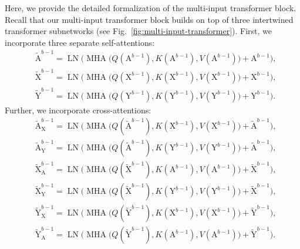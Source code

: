 \documentclass{article}
\theoremstyle{plain}
\theoremstyle{definition}
\theoremstyle{remark}
\begin{document}
Here, we provide the detailed formalization of the multi-input transformer block. Recall that our multi-input transformer block builds on top of three intertwined transformer subnetworks (see Fig.~\ref{fig:multi-input-transformer}). First, we incorporate three separate self-attentions:
\begin{align}
        & \tilde{\mathrm{A}}^{b - 1} = \operatorname{LN}\Big(\operatorname{MHA}\big(Q(\mathrm{A}^{b - 1}), K(\mathrm{A}^{b - 1}), V(\mathrm{A}^{b - 1})\big) + \mathrm{A}^{b - 1}\Big) , \\
        & \tilde{\mathrm{X}}^{b - 1} = \operatorname{LN}\Big(\operatorname{MHA}\big(Q(\mathrm{X}^{b - 1}), K(\mathrm{X}^{b - 1}), V(\mathrm{X}^{b - 1})\big) + \mathrm{X}^{b - 1}\Big) , \\
        & \tilde{\mathrm{Y}}^{b - 1} = \operatorname{LN}\Big(\operatorname{MHA}\big(Q(\mathrm{Y}^{b - 1}), K(\mathrm{Y}^{b - 1}), V(\mathrm{Y}^{b - 1})\big) + \mathrm{Y}^{b - 1}\Big) .
\end{align}
Further, we incorporate cross-attentions:
\begin{align}
        & \tilde{\mathrm{A}}^{b - 1}_{\mathrm{X}} = 
        \operatorname{LN}\Big(\operatorname{MHA}\big(Q(\tilde{\mathrm{A}}^{b - 1}), K(\mathrm{X}^{b - 1}), V(\mathrm{X}^{b - 1})\big) + \tilde{\mathrm{A}}^{b - 1}\Big) , \\ 
        & \tilde{\mathrm{A}}^{b - 1}_{\mathrm{Y}} = 
        \operatorname{LN}\Big(\operatorname{MHA}\big(Q(\tilde{\mathrm{A}}^{b - 1}), K(\mathrm{Y}^{b - 1}), V(\mathrm{Y}^{b - 1})\big) + \tilde{\mathrm{A}}^{b - 1}\Big) , \\[0.3cm]
        & \tilde{\mathrm{X}}^{b - 1}_{\mathrm{A}} = 
        \operatorname{LN}\Big(\operatorname{MHA}\big(Q(\tilde{\mathrm{X}}^{b - 1}), K(\mathrm{A}^{b - 1}), V(\mathrm{A}^{b - 1})\big) + \tilde{\mathrm{X}}^{b - 1}\Big) , \\ 
        & \tilde{\mathrm{X}}^{b - 1}_{\mathrm{Y}} = 
        \operatorname{LN}\Big(\operatorname{MHA}\big(Q(\tilde{\mathrm{X}}^{b - 1}), K(\mathrm{Y}^{b - 1}), V(\mathrm{Y}^{b - 1})\big) + \tilde{\mathrm{X}}^{b - 1}\Big) , \\[0.3cm]
        & \tilde{\mathrm{Y}}^{b - 1}_{\mathrm{X}} = 
        \operatorname{LN}\Big(\operatorname{MHA}\big(Q(\tilde{\mathrm{Y}}^{b - 1}), K(\mathrm{X}^{b - 1}), V(\mathrm{X}^{b - 1})\big) + \tilde{\mathrm{Y}}^{b - 1}\Big) , \\ 
        & \tilde{\mathrm{Y}}^{b - 1}_{\mathrm{A}} = 
        \operatorname{LN}\Big(\operatorname{MHA}\big(Q(\tilde{\mathrm{Y}}^{b - 1}), K(\mathrm{A}^{b - 1}), V(\mathrm{A}^{b - 1})\big) + \tilde{\mathrm{Y}}^{b - 1}\Big) .
\end{align}
\end{document}
